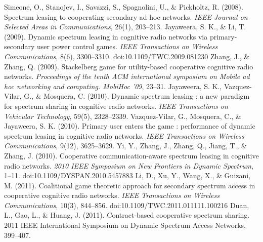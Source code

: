 \begin{thebibliography}{}
 Simeone, O., Stanojev, I., Savazzi, S., Spagnolini, U., \& Pickholtz, R. (2008). Spectrum leasing to cooperating secondary ad hoc networks. \textit{IEEE Journal on Selected Areas in Communications}, 26(1), 203–213.
 Jayaweera, S. K., \& Li, T. (2009). Dynamic spectrum leasing in cognitive radio networks via primary-secondary user power control games. \textit{IEEE Transactions on Wireless Communications}, 8(6), 3300–3310. doi:10.1109/TWC.2009.081230
 Zhang, J., \& Zhang, Q. (2009). Stackelberg game for utility-based cooperative cognitive radio networks. \textit{Proceedings of the tenth ACM international symposium on Mobile ad hoc networking and computing. MobiHoc ’09}, 23–31.
 Jayaweera, S. K., Vazquez-Vilar, G., \& Mosquera, C. (2010). Dynamic spectrum leasing : a new paradigm for spectrum sharing in cognitive radio networks. \textit{IEEE Transactions on Vehicular Technology}, 59(5), 2328–2339.	
 Vazquez-Vilar, G., Mosquera, C., \& Jayaweera, S. K. (2010). Primary user enters the game : performance of dynamic spectrum leasing in cognitive radio networks. \textit{IEEE Transactions on Wireless Communications}, 9(12), 3625–3629.
 Yi, Y., Zhang, J., Zhang, Q., Jiang, T., \& Zhang, J. (2010). Cooperative communication-aware spectrum leasing in cognitive radio networks. \textit{2010 IEEE Symposium on New Frontiers in Dynamic Spectrum}, 1–11. doi:10.1109/DYSPAN.2010.5457883
 Li, D., Xu, Y., Wang, X., \& Guizani, M. (2011). Coalitional game theoretic approach for secondary spectrum access in cooperative cognitive radio networks. \textit{IEEE Transactions on Wireless Communications}, 10(3), 844–856. doi:10.1109/TWC.2011.011111.100216
 Duan, L., Gao, L., \& Huang, J. (2011). Contract-based cooperative spectrum sharing. 2011 IEEE International Symposium on Dynamic Spectrum Access Networks, 399–407.	


\end{thebibliography}
